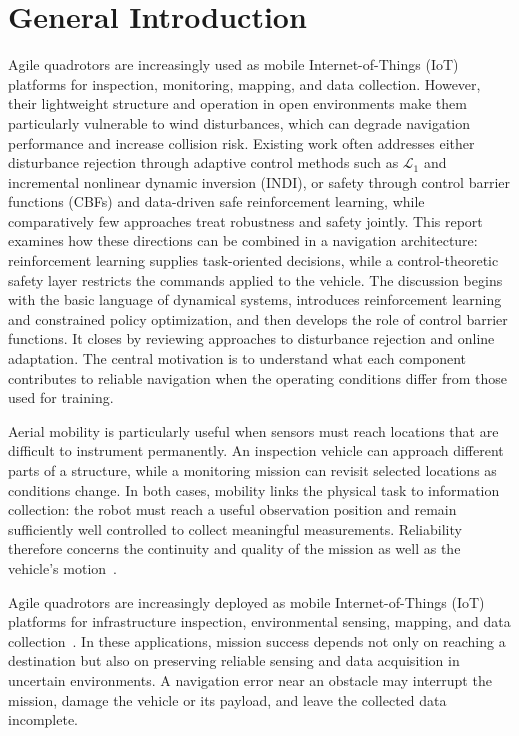 \chapter*{General Introduction}
\label{ch:context}
\begingroup
{}
Agile quadrotors are increasingly used as mobile Internet-of-Things (IoT) platforms for inspection, monitoring, mapping, and data collection. However, their lightweight structure and operation in open environments make them particularly vulnerable to wind disturbances, which can degrade navigation performance and increase collision risk. Existing work often addresses either disturbance rejection through adaptive control methods such as $\mathcal L_1$ and incremental nonlinear dynamic inversion (INDI), or safety through control barrier functions (CBFs) and data-driven safe reinforcement learning, while comparatively few approaches treat robustness and safety jointly. This report examines how these directions can be combined in a navigation architecture: reinforcement learning supplies task-oriented decisions, while a control-theoretic safety layer restricts the commands applied to the vehicle. The discussion begins with the basic language of dynamical systems, introduces reinforcement learning and constrained policy optimization, and then develops the role of control barrier functions. It closes by reviewing approaches to disturbance rejection and online adaptation. The central motivation is to understand what each component contributes to reliable navigation when the operating conditions differ from those used for training.

Aerial mobility is particularly useful when sensors must reach locations that are difficult to instrument permanently. An inspection vehicle can approach different parts of a structure, while a monitoring mission can revisit selected locations as conditions change. In both cases, mobility links the physical task to information collection: the robot must reach a useful observation position and remain sufficiently well controlled to collect meaningful measurements. Reliability therefore concerns the continuity and quality of the mission as well as the vehicle's motion~\cite{mozaffari2019tutorial,bouhamed2020ddpg}.

Agile quadrotors are increasingly deployed as mobile Internet-of-Things (IoT) platforms for infrastructure inspection, environmental sensing, mapping, and data collection~\cite{mozaffari2019tutorial,bouhamed2020ddpg}. In these applications, mission success depends not only on reaching a destination but also on preserving reliable sensing and data acquisition in uncertain environments. A navigation error near an obstacle may interrupt the mission, damage the vehicle or its payload, and leave the collected data incomplete.

